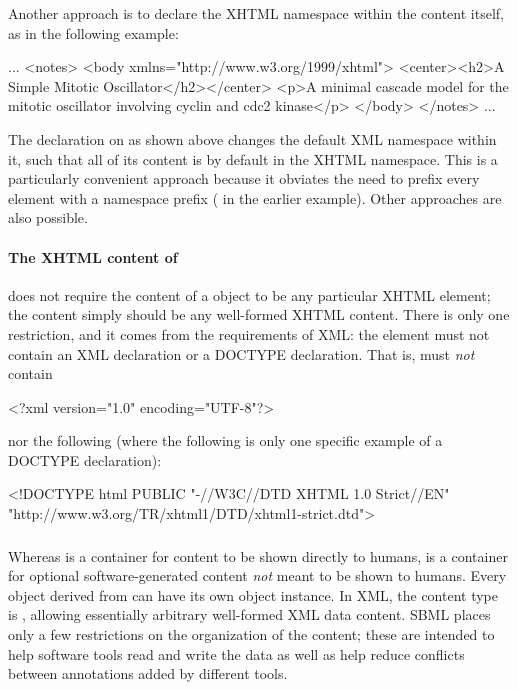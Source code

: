 Another approach is to declare the XHTML namespace within the
 content itself, as in the following example:

\begin{example}
...
<notes>
  <body xmlns="http://www.w3.org/1999/xhtml">
    <center><h2>A Simple Mitotic Oscillator</h2></center>
    <p>A minimal cascade model for the mitotic oscillator involving cyclin and cdc2 kinase</p>
  </body>
</notes>
...
\end{example}

The  declaration on
 as shown above changes the default XML namespace
within it, such that all of its content is by default in the XHTML
namespace.  This is a particularly convenient approach because it
obviates the need to prefix every element with a namespace prefix
(\ie {} in the earlier example).  Other
approaches are also possible.


\paragraph{The XHTML content of }

\sbmlthree does not require the content of a \Notes object to be
any particular XHTML element; the content simply should be any
well-formed XHTML content.  There is only one restriction, and it
comes from the requirements of XML: the  element must
not contain an XML declaration or a DOCTYPE declaration.  That
is,  must \emph{not} contain

\begin{example}
<?xml version="1.0" encoding="UTF-8"?>  
\end{example}

nor the following (where the following is only one specific
example of a DOCTYPE declaration):

\begin{example}
<!DOCTYPE html PUBLIC "-//W3C//DTD XHTML 1.0 Strict//EN"
 "http://www.w3.org/TR/xhtml1/DTD/xhtml1-strict.dtd">
\end{example}


\subsubsection{}
\label{sec:annotation-use}
\label{sec:annotations}

Whereas \Notes is a container for content to be shown directly to
humans, \Annotation is a container for optional software-generated
content \emph{not} meant to be shown to humans.  Every object
derived from \SBase can have its own \Annotation object instance.
In XML, the \Annotation content type is , allowing
essentially arbitrary well-formed XML data content.  SBML places
only a few restrictions on the organization of the content; these
are intended to help software tools read and write the data as
well as help reduce conflicts between annotations added by
different tools.



